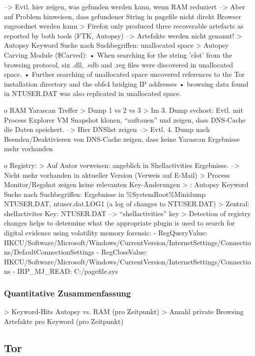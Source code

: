 	--> Evtl. hier zeigen, was gefunden werden kann, wenn RAM reduziert
	--> Aber auf Problem hinweisen, dass gefundener String in pagefile nicht direkt Browser zugeordnet werden kann
	> \cite{Gabet.2018}	Firefox only produced three recoverable artefacts as reported by both tools (FTK, Autopsy) --> Artefakte werden nicht genannt!
	> \cite{Muir.2019} Autopsy Keyword Suche nach Suchbegriffen: unallocated space
	> Autopsy Carving Module (\$Carved): \cite{Muir.2019}
		•	When searching for the string ’clot’ from the browsing protocol, six .dll, .edb and .reg files were discovered in unallocated space.
		•	Further searching of unallocated space uncovered references to the Tor installation directory and the obfs4 bridging IP addresses
		•	browsing data found in NTUSER.DAT was also replicated in unallocated space.
	
	
o	RAM Yarascan Treffer
	>	Dump 1 vs 2 vs 3 
	>	Im 3. Dump svchost: Evtl. mit Process Explorer VM Snapshot klonen, “auftauen” und zeigen, dass DNS-Cache die Daten speichert. 
	-->	Hier DNSlist zeigen
	-->	Evtl. 4. Dump nach Beenden/Deaktivieren von DNS-Cache zeigen, dass keine Yarascan Ergebnisse mehr vorhanden
	
o	Registry:
	>	Auf Autor verweisen: angeblich in Shellactivities Ergebnisse. --> Nicht mehr vorhanden in aktueller Version (Verweis auf E-Mail)
	>	Process Monitor/Regshot zeigen keine relevanten Key-Änderungen
	> \cite{Muir.2019}: Autopsy Keyword Suche nach Suchbegriffen: Ergebnisse in \%SystemRoot\%Minidump NTUSER.DAT, ntuser.dat.LOG1 (a log of changes to NTUSER.DAT)
	> Zentral: shellactivites Key:	NTUSER.DAT --> “shellactivities” key \cite{Muir.2019}
	> \cite{Rochmadi.2017} Detection of registry changes helps to determine what the appropriate plugin is used to search for digital evidence using volatility memory forensic:
		- RegQueryValue:	HKCU/Software/Microsoft/Windows/CurrentVersion/InternetSettings/Connections/DefaultConnectionSettings
		- RegCloseValue: 	HKCU/Software/Microsoft/Windows/CurrentVersion/InternetSettings/Connections
		- IRP\_MJ\_READ: C:/pagefile.sys
		
		

\subsubsection*{Quantitative Zusammenfassung}
>	Keyword-Hits Autopsy vs. RAM (pro Zeitpunkt)
>	Anzahl private Browsing Artefakte pro Keyword (pro Zeitpunkt)

\subsection{Tor}


